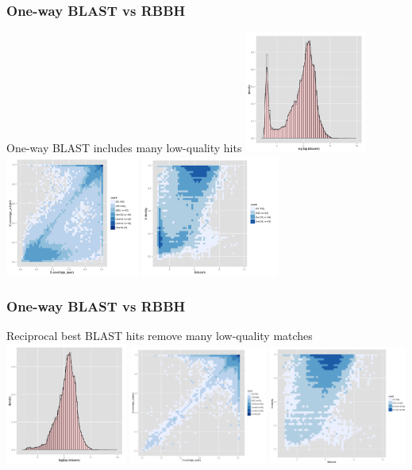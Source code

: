 \documentclass[table]{beamer}
\begin{document}
    \begin{frame}
      \frametitle{One-way BLAST vs RBBH}   
      One-way BLAST includes many low-quality hits
        \includegraphics[width=0.3\textwidth]{images/rbbh1}
        \includegraphics[width=0.33\textwidth]{images/rbbh2}
        \includegraphics[width=0.34\textwidth]{images/rbbh3}
    \end{frame}

    \begin{frame}
      \frametitle{One-way BLAST vs RBBH}   
      Reciprocal best BLAST hits remove many low-quality matches
        \includegraphics[width=0.3\textwidth]{images/rbbh4}
        \includegraphics[width=0.34\textwidth]{images/rbbh5}
        \includegraphics[width=0.34\textwidth]{images/rbbh6}
    \end{frame}
\end{document}
